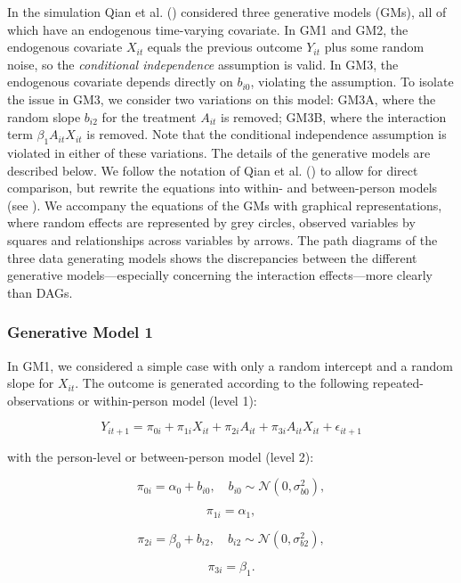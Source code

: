 \documentclass[
  12pt,
  a4paper,
]{article}
\begin{document}
In the simulation Qian et al. () considered
three generative models (GMs), all of which have an endogenous
time-varying covariate. In GM1 and GM2, the endogenous covariate
\(X_{it}\) equals the previous outcome \(Y_{it}\) plus some random
noise, so the \emph{conditional independence} assumption is valid. In
GM3, the endogenous covariate depends directly on \(b_{i0}\), violating
the assumption. To isolate the issue in GM3, we consider two variations
on this model: GM3A, where the random slope \(b_{i2}\) for the treatment
\(A_{it}\) is removed; GM3B, where the interaction term
\(\beta_1 A_{it} X_{it}\) is removed. Note that the conditional
independence assumption is violated in either of these variations. The
details of the generative models are described below. We follow the
notation of Qian et al. () to allow for
direct comparison, but rewrite the equations into within- and
between-person models (see ). We accompany the equations of the GMs with graphical
representations, where random effects are represented by grey circles,
observed variables by squares and relationships across variables by
arrows. The path diagrams of the three data generating models shows the
discrepancies between the different generative models---especially
concerning the interaction effects---more clearly than DAGs.

\subsubsection{Generative Model 1}\label{generative-model-1}

In GM1, we considered a simple case with only a random intercept and a
random slope for \(X_{it}\). The outcome is generated according to the
following repeated-observations or within-person model (level 1):

\[
Y_{it+1} = \pi_{0i} + \pi_{1i} X_{it} + \pi_{2i} A_{it} + \pi_{3i} A_{it} X_{it} + \epsilon_{it+1}
\]

with the person-level or between-person model (level 2):

\[
\pi_{0i} = \alpha_0 + b_{i0}, \quad b_{i0} \sim \mathcal{N}(0, \sigma_{b0}^2),
\]

\[
\pi_{1i} = \alpha_1,
\]

\[
\pi_{2i} = \beta_0 + b_{i2}, \quad b_{i2} \sim \mathcal{N}(0, \sigma_{b2}^2),
\]

\[
\pi_{3i} = \beta_1.
\]
\end{document}
